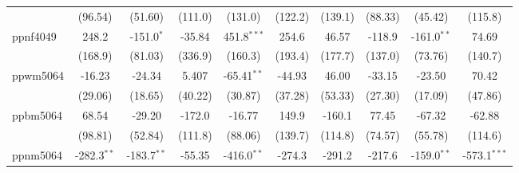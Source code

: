 \begin{table}[htbp]
\begin{tabular}{lccccccccc}
                                     & (96.54)                      & (51.60)                       & (111.0)                     & (131.0)                   & (122.2)                       & (139.1)                      & (88.33)                       & (45.42)                      & (115.8)\\   
      ppnf4049                       & 248.2                        & -151.0$^{*}$                  & -35.84                      & 451.8$^{***}$             & 254.6                         & 46.57                        & -118.9                        & -161.0$^{**}$                & 74.69\\   
                                     & (168.9)                      & (81.03)                       & (336.9)                     & (160.3)                   & (193.4)                       & (177.7)                      & (137.0)                       & (73.76)                      & (140.7)\\   
      ppwm5064                       & -16.23                       & -24.34                        & 5.407                       & -65.41$^{**}$             & -44.93                        & 46.00                        & -33.15                        & -23.50                       & 70.42\\   
                                     & (29.06)                      & (18.65)                       & (40.22)                     & (30.87)                   & (37.28)                       & (53.33)                      & (27.30)                       & (17.09)                      & (47.86)\\   
      ppbm5064                       & 68.54                        & -29.20                        & -172.0                      & -16.77                    & 149.9                         & -160.1                       & 77.45                         & -67.32                       & -62.88\\   
                                     & (98.81)                      & (52.84)                       & (111.8)                     & (88.06)                   & (139.7)                       & (114.8)                      & (74.57)                       & (55.78)                      & (114.6)\\   
      ppnm5064                       & -282.3$^{**}$                & -183.7$^{**}$                 & -55.35                      & -416.0$^{**}$             & -274.3                        & -291.2                       & -217.6                        & -159.0$^{**}$                & -573.1$^{***}$\\   

\end{tabular}
\end{table}
